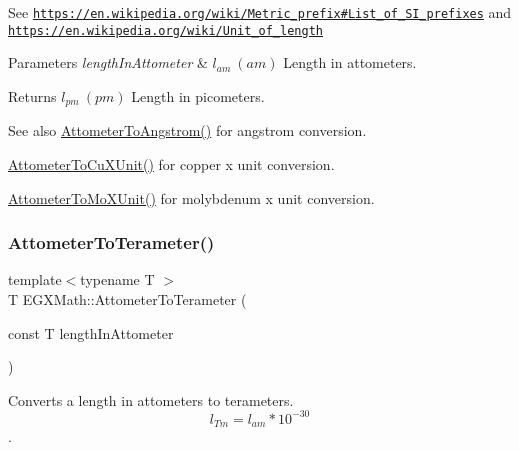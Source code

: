 See \href{https://en.wikipedia.org/wiki/Metric_prefix#List_of_SI_prefixes}{\tt https\+://en.\+wikipedia.\+org/wiki/\+Metric\+\_\+prefix\#\+List\+\_\+of\+\_\+\+S\+I\+\_\+prefixes} and \href{https://en.wikipedia.org/wiki/Unit_of_length}{\tt https\+://en.\+wikipedia.\+org/wiki/\+Unit\+\_\+of\+\_\+length} 
\begin{DoxyParams}{Parameters}
{\em length\+In\+Attometer} & $ l_{am}\ (am)$ Length in attometers. \\
\hline
\end{DoxyParams}
\begin{DoxyReturn}{Returns}
$ l_{pm}\ (pm)$ Length in picometers. 
\end{DoxyReturn}
\begin{DoxySeeAlso}{See also}
\mbox{\hyperlink{group___e_g_x_math-_conversions-_length_conversions-_s_i-_attometer-_non-_s_i_ga331ff6e8159f6f00bb7a20e39fa4d756}{Attometer\+To\+Angstrom()}} for angstrom conversion. 

\mbox{\hyperlink{group___e_g_x_math-_conversions-_length_conversions-_s_i-_attometer-_non-_s_i_gabd388c2e0821ac9066b4fb87e35402b1}{Attometer\+To\+Cu\+X\+Unit()}} for copper x unit conversion. 

\mbox{\hyperlink{group___e_g_x_math-_conversions-_length_conversions-_s_i-_attometer-_non-_s_i_ga79ec6f4ec4a97af05fe8f69b80805ab7}{Attometer\+To\+Mo\+X\+Unit()}} for molybdenum x unit conversion. 
\end{DoxySeeAlso}
\mbox{\label{group___e_g_x_math-_conversions-_length_conversions-_s_i-_attometer-_s_i_gac4d61e3aceb437ff7d52729ed4860f61}} 
\subsubsection{\texorpdfstring{Attometer\+To\+Terameter()}{AttometerToTerameter()}}
{\footnotesize\ttfamily template$<$typename T $>$ \\
T E\+G\+X\+Math\+::\+Attometer\+To\+Terameter (\begin{DoxyParamCaption}\item[{const T}]{length\+In\+Attometer }\end{DoxyParamCaption})}



Converts a length in attometers to terameters. \[ l_{Tm}=l_{am} * 10^{-30} \]. 


